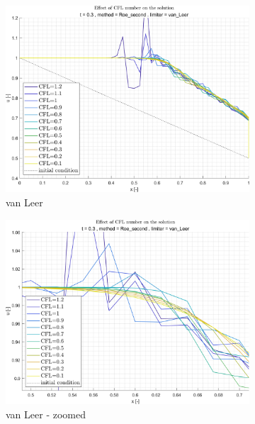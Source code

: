 \documentclass[11pt, a4paper]{article}
\begin{document}
\begin{figure}[H]
    \begin{subfigure}[c]{.35\textwidth}
        \centering
        \includegraphics[width=\textwidth]{images/grap5.png}
        \caption{van Leer}
        \label{fig:roe_second_van_Leer_A}
    \end{subfigure}
    \begin{subfigure}[c]{.35\textwidth}
        \centering
        \includegraphics[width=\textwidth]{images/grap5.1.png}
        \caption{van Leer - zoomed}
        \label{fig:roe_second_van_Leer_B}
    \end{subfigure}
    \begin{subfigure}[c]{.35\textwidth}
        \centering

\end{subfigure}
\end{figure}
\end{document}
